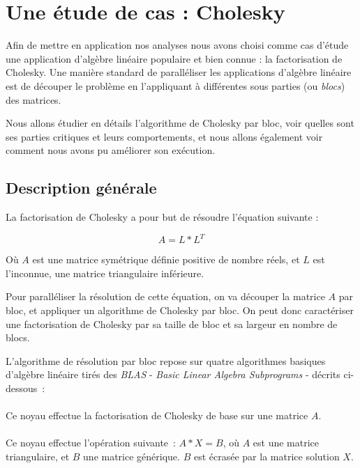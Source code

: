 \section{Une étude de cas : Cholesky}\label{sec:contribs:apps:cholesky}

Afin de mettre en application nos analyses nous avons choisi comme cas d'étude une application d'algèbre linéaire populaire et bien connue : la factorisation de Cholesky.
Une manière standard de paralléliser les applications d'algèbre linéaire est de découper le problème en l'appliquant à différentes sous parties (ou \emph{blocs}) des matrices.

Nous allons étudier en détails l'algorithme de Cholesky par bloc, voir quelles sont ses parties critiques et leurs comportements, et nous allons également voir comment nous avons pu améliorer son exécution.


\subsection{Description générale}

La factorisation de Cholesky a pour but de résoudre l'équation suivante :

$$ A = L*L^T$$

Où $A$ est une matrice symétrique définie positive de nombre réels, et $L$ est l'inconnue, une matrice triangulaire inférieure.

Pour paralléliser la résolution de cette équation, on va découper la matrice $A$ par bloc, et appliquer un algorithme de Cholesky par bloc.
On peut donc caractériser une factorisation de Cholesky par sa taille de bloc et sa largeur en nombre de blocs.

L'algorithme de résolution par bloc repose sur quatre algorithmes basiques d'algèbre linéaire tirés des \emph{BLAS} - \emph{Basic Linear Algebra Subprograms} - décrits ci-dessous~:


\paragraph{}

Ce noyau effectue la factorisation de Cholesky de base sur une matrice $A$.

\paragraph{}

Ce noyau effectue l'opération suivante~: $A*X = B$, où $A$ est une matrice triangulaire, et $B$ une matrice générique. $B$ est écrasée par la matrice solution $X$.

